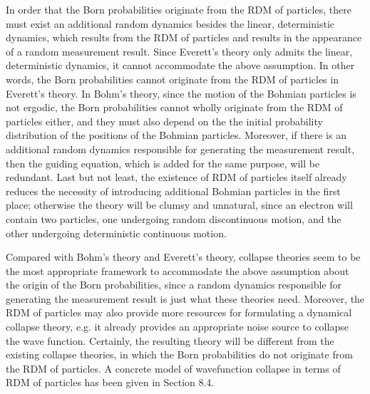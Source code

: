 In order that the Born probabilities originate from the RDM of particles, 
there must exist an additional random dynamics besides the linear, deterministic dynamics, which results from the RDM of particles and results in the appearance of a random measurement result.
Since Everett's theory only admits the linear, deterministic dynamics, it cannot accommodate the above assumption. In other words, the Born probabilities cannot originate from the RDM of particles in Everett's theory.
In Bohm's theory, since the motion of the Bohmian particles is not ergodic, the Born probabilities cannot wholly originate from the RDM of particles either, and they must also depend on the the initial probability distribution of the positions of the Bohmian particles.
Moreover, if there is an additional random dynamics responsible for generating the measurement result, then the guiding equation, which is added for the same purpose, will be redundant.
Last but not least, the existence of RDM of particles itself already reduces the necessity of introducing additional Bohmian particles in the first place; otherwise the theory will be clumsy and unnatural, since an electron will contain two particles, one undergoing random discontinuous motion, and the other undergoing deterministic continuous motion.

Compared with Bohm's theory and Everett's theory, collapse theories seem to be the most appropriate framework to accommodate the above assumption about the origin of the Born probabilities, since a random dynamics  responsible for generating the measurement result is just what these theories need. Moreover, the RDM of particles may also provide more resources for formulating a dynamical collapse theory, e.g. it already provides an appropriate noise source to collapse the wave function. Certainly, the resulting theory will be different from the existing collapse theories, in which the Born probabilities do not originate from the RDM of particles. A concrete model of wavefunction collapse in terms of RDM of particles has been given in Section 8.4.

